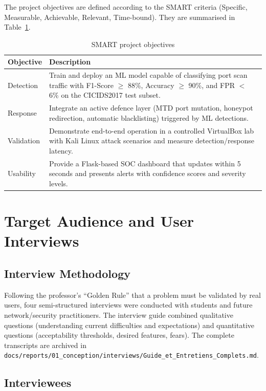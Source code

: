The project objectives are defined according to the SMART criteria (Specific, Measurable, Achievable, Relevant, Time-bound). They are summarised in Table~\ref{tab:objectives}.

\begin{table}[H]
\centering
\caption{SMART project objectives}
\label{tab:objectives}
\begin{tabularx}{\textwidth}{lX}
\toprule
\textbf{Objective} & \textbf{Description} \\
\midrule
Detection & Train and deploy an ML model capable of classifying port scan traffic with F1-Score $\geq$ 88\%, Accuracy $\geq$ 90\%, and FPR $<$ 6\% on the CICIDS2017 test subset. \\
Response & Integrate an active defence layer (MTD port mutation, honeypot redirection, automatic blacklisting) triggered by ML detections. \\
Validation & Demonstrate end-to-end operation in a controlled VirtualBox lab with Kali Linux attack scenarios and measure detection/response latency. \\
Usability & Provide a Flask-based SOC dashboard that updates within 5 seconds and presents alerts with confidence scores and severity levels. \\
\bottomrule
\end{tabularx}
\end{table}

\section{Target Audience and User Interviews}\label{sec:interviews}

\subsection{Interview Methodology}

Following the professor's ``Golden Rule'' that a problem must be validated by real users, four semi-structured interviews were conducted with students and future network/security practitioners. The interview guide combined qualitative questions (understanding current difficulties and expectations) and quantitative questions (acceptability thresholds, desired features, fears). The complete transcripts are archived in \texttt{docs/reports/01\_conception/interviews/Guide\_et\_Entretiens\_Complets.md}.

\subsection{Interviewees}

